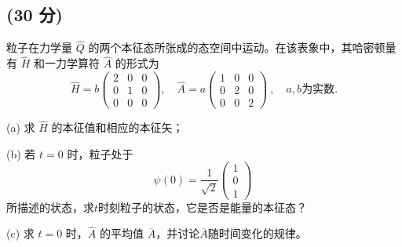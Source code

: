  \subsection{(30 分)}
 粒子在力学量 $\hat{Q}$ 的两个本征态所张成的态空间中运动。在该表象中，其哈密顿量有 $\hat{H}$ 和一力学算符 $\hat{A}$ 的形式为
$$
\hat{H} = b \begin{pmatrix}
2 & 0 & 0 \\
0 & 1 & 0 \\
0 & 0 & 0 
\end{pmatrix}, \quad \hat{A} = a \begin{pmatrix}
1 & 0 & 0 \\
0 & 2 & 0 \\
0 & 0 & 2 
\end{pmatrix}~, \quad a, b \text{为实数}.
$$

(a) 求 $\hat{H}$ 的本征值和相应的本征矢；

(b) 若 $t = 0$ 时，粒子处于
$$
\psi(0) = \frac{1}{\sqrt{2}} \begin{pmatrix}
1 \\
0 \\
1
\end{pmatrix}~
$$
所描述的状态，求$t$时刻粒子的状态，它是否是能量的本征态？

(c) 求 $t = 0$ 时，$\hat{A}$ 的平均值 $\overline{A}$，并讨论$\overline{A}$随时间变化的规律。